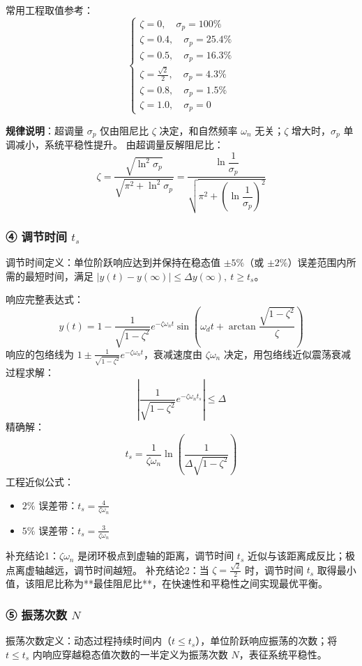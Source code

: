 常用工程取值参考：
\[
\begin{cases}
\zeta=0,\quad \sigma_p=100\% \\
\zeta=0.4,\quad \sigma_p=25.4\% \\
\zeta=0.5,\quad \sigma_p=16.3\% \\
\zeta=\frac{\sqrt{2}}{2},\quad \sigma_p=4.3\% \\
\zeta=0.8,\quad \sigma_p=1.5\% \\
\zeta=1.0,\quad \sigma_p=0
\end{cases}
\]

\textbf{规律说明}：超调量 $\sigma_p$ 仅由阻尼比 $\zeta$ 决定，和自然频率 $\omega_n$ 无关；$\zeta$ 增大时，$\sigma_p$ 单调减小，系统平稳性提升。
由超调量反解阻尼比：
\[
\zeta=\frac{\sqrt{\ln^2 \sigma_p}}{\sqrt{\pi^2+\ln^2 \sigma_p}}=\frac{\ln \dfrac{1}{\sigma_p}}{\sqrt{\pi^2+\left(\ln \dfrac{1}{\sigma_p}\right)^2}}
\]

\subsubsection{④ 调节时间 $t_s$}
调节时间定义：单位阶跃响应达到并保持在稳态值 $\pm5\%$（或 $\pm2\%$）误差范围内所需的最短时间，满足 $|y(t)-y(\infty)|\le \Delta y(\infty),\ t\ge t_s$。

响应完整表达式：
\[
y(t) = 1 - \frac{1}{\sqrt{1-\zeta^2}}e^{-\zeta\omega_n t}\sin\left(\omega_d t + \arctan\frac{\sqrt{1-\zeta^2}}{\zeta}\right)
\]
响应的包络线为 $\displaystyle 1\pm\frac{1}{\sqrt{1-\zeta^2}}e^{-\zeta\omega_n t}$，衰减速度由 $\zeta\omega_n$ 决定，用包络线近似震荡衰减过程求解：
\[
\left|\frac{1}{\sqrt{1-\zeta^2}}e^{-\zeta\omega_n t_s}\right|\le \Delta
\]
精确解：
\[
t_s = \frac{1}{\zeta\omega_n}\ln\left(\frac{1}{\Delta\sqrt{1-\zeta^2}}\right)
\]
工程近似公式：
\begin{itemize}
    \item $2\%$ 误差带：$\displaystyle t_s=\frac{4}{\zeta\omega_n}$
    \item $5\%$ 误差带：$\displaystyle t_s=\frac{3}{\zeta\omega_n}$
\end{itemize}

补充结论1：$\zeta\omega_n$ 是闭环极点到虚轴的距离，调节时间 $t_s$ 近似与该距离成反比；极点离虚轴越远，调节时间越短。
补充结论2：当 $\zeta=\frac{\sqrt{2}}{2}$ 时，调节时间 $t_s$ 取得最小值，该阻尼比称为**最佳阻尼比**，在快速性和平稳性之间实现最优平衡。

\subsubsection{⑤ 振荡次数 $N$}
振荡次数定义：动态过程持续时间内（$t\le t_s$），单位阶跃响应振荡的次数；将 $t\le t_s$ 内响应穿越稳态值次数的一半定义为振荡次数 $N$，表征系统平稳性。


